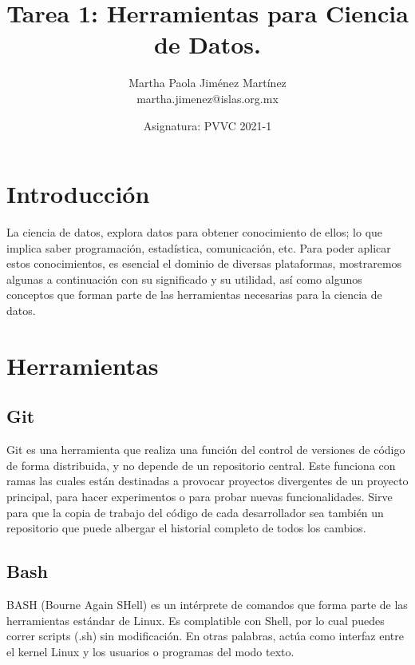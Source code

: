 \documentclass[12pt,letterpaper]{article}
\begin{document}
\title{\textbf{Tarea 1: Herramientas para Ciencia de Datos.}} \author{Martha Paola Jiménez Martínez
\\
\small{martha.jimenez@islas.org.mx}}
\date{ \small{Asignatura: PVVC 2021-1}
} 
\maketitle


\section*{Introducción}
La ciencia de datos, explora datos para obtener conocimiento de ellos; lo que implica saber
programación, estadística, comunicación, etc. Para poder aplicar estos conocimientos, es esencial el
dominio de diversas plataformas, mostraremos algunas a continuación con su significado y su
utilidad, así como algunos conceptos que forman parte de las herramientas necesarias para la ciencia
de datos.

\section*{Herramientas}
\subsection*{Git}
Git es una herramienta que realiza una función del control de versiones de código de forma
distribuida, y no depende de un repositorio central. Este funciona con ramas las cuales están
destinadas a provocar proyectos divergentes de un proyecto principal, para hacer experimentos o para
probar nuevas funcionalidades.
\citep{rubio_2020}
Sirve para que la copia de trabajo del código de cada desarrollador sea también un repositorio que
puede albergar el historial completo de todos los cambios.
\citep{bitbucket_git}

\subsection*{Bash}
BASH (Bourne Again SHell) es un intérprete de comandos que forma parte de las herramientas estándar
de Linux. Es complatible con Shell, por lo cual puedes correr scripts (.sh) sin modificación. En
otras palabras, actúa como interfaz entre el kernel Linux y los usuarios o programas del modo texto.
\citep{canepa_2018}
\end{document}
